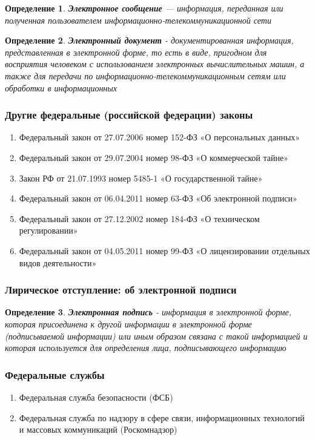 \documentclass{article}
\newtheorem{definition}{Определение}
\begin{document}
\begin{definition}
    \textbf{Электронное сообщение} — информация, переданная или полученная пользователем информационно-телекоммуникационной сети 
\end{definition}

\begin{definition}
    \textbf{Электронный документ} - документированная информация, представленная в электронной форме, то есть в виде, пригодном для восприятия человеком с использованием электронных вычислительных машин, а также для передачи по информационно-телекоммуникационным сетям или обработки в информационных
\end{definition}

\subsubsection{Другие федеральные (российской федерации) законы}

\begin{enumerate}
    \item Федеральный закон от 27.07.2006 номер 152-ФЗ «О персональных данных»
    \item Федеральный закон от 29.07.2004 номер 98-ФЗ «О коммерческой тайне»
    \item Закон РФ от 21.07.1993 номер 5485-1 «О государственной тайне»
    \item Федеральный закон от 06.04.2011 номер 63-ФЗ «Об электронной подписи»
    \item Федеральный закон от 27.12.2002 номер 184-ФЗ «О техническом регулировании»
    \item Федеральный закон от 04.05.2011 номер 99-ФЗ «О лицензировании отдельных видов деятельности»
\end{enumerate}

\subsubsection{Лирическое отступление: об электронной подписи}

\begin{definition}
    \textbf{Электронная подпись} - информация в электронной форме, которая присоединена к другой информации в электронной форме (подписываемой информации) или иным образом связана с такой информацией и которая используется для определения лица, подписывающего информацию
\end{definition}

\subsubsection{Федеральные службы}

\begin{enumerate}
    \item Федеральная служба безопасности (ФСБ)
    \item Федеральная служба по надзору в сфере связи, информационных технологий и массовых коммуникаций (Роскомнадзор)
\end{enumerate}
\end{document}
